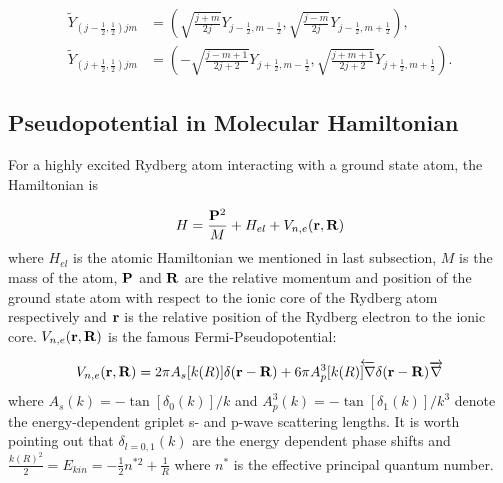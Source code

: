\documentclass[british,english]{article}
\numberwithin{equation}{section}
\numberwithin{figure}{section}
\begin{document}
\begin{equation}
\begin{aligned}
\tilde{Y}_{(j-\frac{1}{2},\frac{1}{2})jm}&=\left(\sqrt{\frac{j+m}{2j}}Y_{j-\frac{1}{2},m-\frac 12}, \sqrt{\frac{j-m}{2j}}Y_{j-\frac 12,m+\frac 12}\right),\\
\tilde{Y}_{(j+\frac{1}{2},\frac{1}{2})jm}&=\left(-\sqrt{\frac{j-m+1}{2j+2}}Y_{j+\frac{1}{2},m-\frac 12}, \sqrt{\frac{j+m+1}{2j+2}}Y_{j+\frac 12,m+\frac 12}\right).
\label{equ:spinors}
\end{aligned}
\end{equation}

\subsection{Pseudopotential in Molecular Hamiltonian}

For a highly excited Rydberg atom interacting with a ground state
atom, the Hamiltonian is

\begin{equation}
H=\frac{{\bf P}^{2}}{M}+H_{el}+V_{n,e}({\bf r,R})
\end{equation}
where $H_{el}$ is the atomic Hamiltonian we mentioned in last subsection,
$M$ is the mass of the atom, ${\bf P}$ and ${\bf R}$ are the relative
momentum and position of the ground state atom with respect to the
ionic core of the Rydberg atom respectively and ${\bf r}$ is the
relative position of the Rydberg electron to the ionic core. $V_{n,e}({\bf r,R})$
is the famous Fermi-Pseudopotential:

\begin{equation}
V_{n,e}({\bf r,R})=2\pi A_{s}[k(R)]\delta({\bf r}-{\bf R})+6\pi A_{p}^{3}[k(R)\overleftarrow{]\nabla}\delta({\bf r}-{\bf R})\overrightarrow{\nabla}
\end{equation}
where $A_{s}(k)=-\tan[\delta_{0}(k)]/k$ and $A_{p}^{3}(k)=-\tan[\delta_{1}(k)]/k^{3}$
denote the energy-dependent griplet s- and p-wave scattering lengths.
It is worth pointing out that $\delta_{l=0,1}(k)$ are the energy
dependent phase shifts and $\frac{k(R)^{2}}{2}=E_{kin}=-\frac{1}{2}n^{*2}+\frac{1}{R}$
where $n^{*}$ is the effective principal quantum number.
\end{document}
